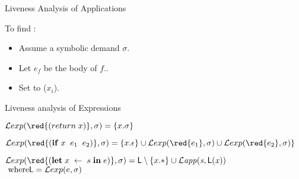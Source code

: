 \documentclass[xcolor=x11names,compress,mathserif]{beamer}
\renewcommand{\(}{\begin{columns}}
\renewcommand{\)}{\end{columns}}
\newcommand{\<}[1]{\begin{column}{#1}}
\renewcommand{\>}{\end{column}}
\begin{document}
\begin{frame}{Liveness Analysis of Applications}
{
\bigskip
\vspace*{-1.5cm}
  \begin{itemize}
 {\item To find : 
    \begin{itemize}
     \item Assume a symbolic demand $\sigma$.
     \item Let $e_f$ be the body of $f$..  
    \item Set   to ($x_i$).
    \end{itemize}}
  \end{itemize}
}
\end{frame}

\begin{frame}{Liveness analysis of Expressions}

\normalsize
$\Lexp{{\red{(return\; x)}}}{\sigma} = \{x.\sigma\}$


\bigskip
\medskip

  $\Lexp{{\red{(\SIF \; x\;\;  e_1\; \; e_2)}}}{\sigma} = \{x.\epsilon\} 
 \cup \Lexp{{\red{ e_1}}}{\sigma} \cup \Lexp{{\red{e_2}}}{\sigma}\}$



\bigskip
\medskip

$  \Lexp{{\red{(\LET \; x\; \leftarrow \; s \; \IN \; e)}}}{\sigma} = \Lv
           \setminus \{x.*\}
           \cup \mathit{\Lapp{s}{\Lv(x)}}$\\
\hspace*{4.5cm} $ \mbox{ where} \mathsf{L} = \mathcal{L}exp(e,\sigma)$

\bigskip




\end{frame}

\end{document}
